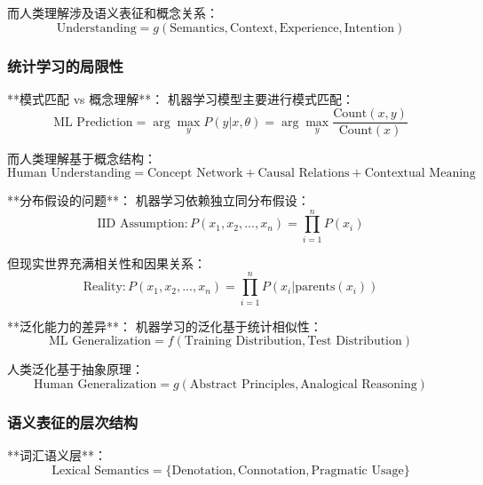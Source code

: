 而人类理解涉及语义表征和概念关系：
\begin{equation}
\text{Understanding} = g(\text{Semantics}, \text{Context}, \text{Experience}, \text{Intention})
\end{equation}

\subsubsection{统计学习的局限性} %

**模式匹配 vs 概念理解**：
机器学习模型主要进行模式匹配：
\begin{equation}
\text{ML Prediction} = \arg\max_{y} P(y|x, \theta) = \arg\max_{y} \frac{\text{Count}(x,y)}{\text{Count}(x)}
\end{equation}

而人类理解基于概念结构：
\begin{equation}
\text{Human Understanding} = \text{Concept Network} + \text{Causal Relations} + \text{Contextual Meaning}
\end{equation}

**分布假设的问题**：
机器学习依赖独立同分布假设：
\begin{equation}
\text{IID Assumption}: P(x_1, x_2, ..., x_n) = \prod_{i=1}^n P(x_i)
\end{equation}

但现实世界充满相关性和因果关系：
\begin{equation}
\text{Reality}: P(x_1, x_2, ..., x_n) = \prod_{i=1}^n P(x_i|\text{parents}(x_i))
\end{equation}

**泛化能力的差异**：
机器学习的泛化基于统计相似性：
\begin{equation}
\text{ML Generalization} = f(\text{Training Distribution}, \text{Test Distribution})
\end{equation}

人类泛化基于抽象原理：
\begin{equation}
\text{Human Generalization} = g(\text{Abstract Principles}, \text{Analogical Reasoning})
\end{equation}

\subsubsection{语义表征的层次结构} %

**词汇语义层**：
\begin{equation}
\text{Lexical Semantics} = \{\text{Denotation}, \text{Connotation}, \text{Pragmatic Usage}\}
\end{equation}

